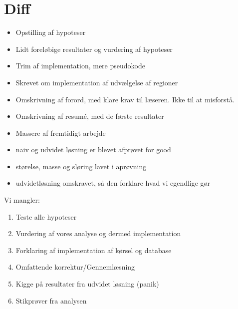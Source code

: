 {
\section*{Diff}
\begin{itemize}
    \item Opstilling af hypoteser
    \item Lidt foreløbige resultater og vurdering af hypoteser
    \item Trim af implementation, mere pseudokode
    \item Skrevet om implementation af udvælgelse af regioner
    \item Omskrivning af forord, med klare krav til læseren. Ikke
        til at misforstå.
    \item Omskrivning af resumé, med de første resultater
    \item Massere af fremtidigt arbejde
	\item naiv og udvidet løsning er blevet afprøvet for good
	\item størelse, masse og sløring lavet i aprøvning
	\item udvidetløsning omskravet, så den forklare hvad vi egendlige gør
\end{itemize}

Vi mangler:
\begin{enumerate}
    \item Teste alle hypoteser
    \item Vurdering af vores analyse og dermed implementation
    \item Forklaring af implementation af kørsel og database
    \item Omfattende korrektur/Gennemlæsning
    \item Kigge på resultater fra udvidet løsning (panik)
    \item Stikprøver fra analysen
\end{enumerate}
}

